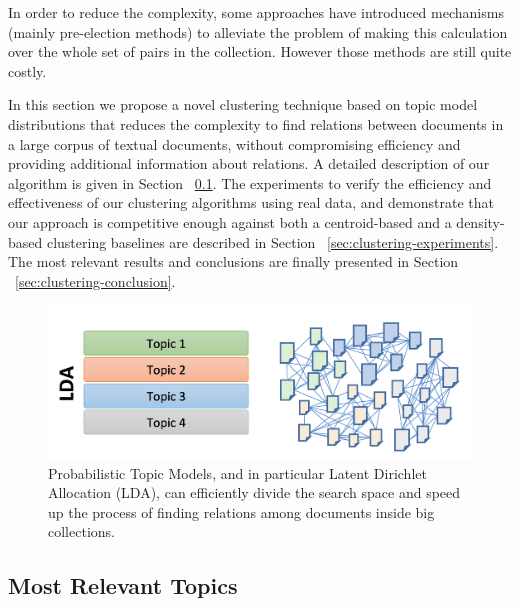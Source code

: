 In order to reduce the complexity, some approaches have introduced mechanisms (mainly pre-election methods) to alleviate the problem of making this calculation over the whole set of pairs in the collection. However those methods are still quite costly.

In this section we propose a novel clustering technique based on topic model distributions that reduces the complexity to find relations between documents in a large corpus of textual documents, without compromising efficiency and providing additional information about relations. A detailed description of our algorithm is given in Section ~\ref{sec:clustering-approach}. The experiments to verify the efficiency and effectiveness of our clustering algorithms using real data, and demonstrate that our approach is competitive enough against both a centroid-based and a density-based clustering baselines are described in Section ~\ref{sec:clustering-experiments}. The most relevant results and conclusions are finally presented in Section ~\ref{sec:clustering-conclusion}.

\begin{figure}
  \centering
  \includegraphics[scale=0.37]{lda-cluster.png}
  \caption{Probabilistic Topic Models, and in particular Latent Dirichlet Allocation (LDA), can efficiently divide the search space and speed up the process of finding relations among documents inside big collections.}
  \label{fig:lda-cluster}
\end{figure}



\subsection{Most Relevant Topics}
\label{sec:clustering-approach}

